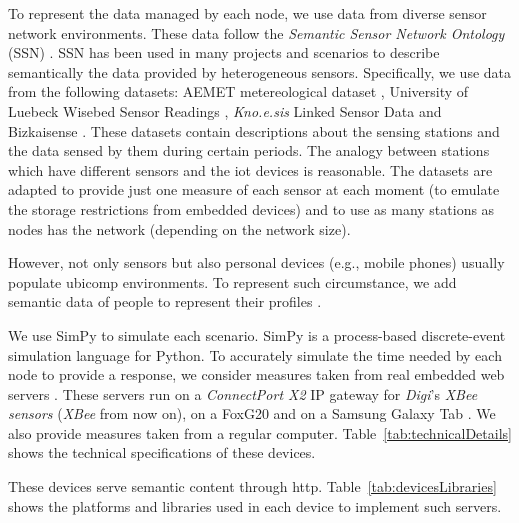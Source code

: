 To represent the data managed by each node, we use data from diverse sensor network environments.
These data follow the \textit{Semantic Sensor Network Ontology} (SSN) .
SSN has been used in many projects and scenarios to describe semantically the data provided by heterogeneous sensors.
Specifically, we use data from the following datasets:
AEMET metereological dataset ,
University of Luebeck Wisebed Sensor Readings ,
\emph{Kno.e.sis} Linked Sensor Data 
and Bizkaisense .
These datasets contain descriptions about the sensing stations and the data sensed by them during certain periods.
The analogy between stations which have different sensors and the \ac{iot} devices is reasonable.
The datasets are adapted to provide just one measure of each sensor at each moment (to emulate the storage restrictions from embedded devices) and to use as many stations as nodes has the network (depending on the network size).

However, not only sensors but also personal devices (e.g., mobile phones) usually populate \ac{ubicomp} environments.
To represent such circumstance, we add semantic data of people to represent their profiles .

We use SimPy  to simulate each scenario.
SimPy is a process-based discrete-event simulation language for Python.
To accurately simulate the time needed by each node to provide a response, we consider measures taken from real embedded web servers \citep{gomez-goiri_restful_2012}.
These servers run on a \textit{ConnectPort X2} IP gateway  for \textit{Digi}'s \textit{XBee sensors}  (\textit{XBee} from now on),
on a FoxG20  and on a Samsung Galaxy Tab .
We also provide measures taken from a regular computer.
Table~\ref{tab:technicalDetails} shows the technical specifications of these devices.





These devices serve semantic content through \acs{http}.
Table~\ref{tab:devicesLibraries} shows the platforms and libraries used in each device to implement such servers.




